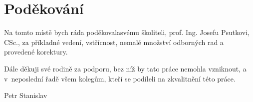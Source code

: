 \chapter*{Poděkování}

\noindent Na tomto místě bych ráda poděkovalasvému školiteli, prof. Ing. Josefu Psutkovi, CSc., za příkladné vedení, vstřícnost, nemalé množství odborných rad a provedené korektury.

\vspace*{1cm}

\noindent Dále děkuji své rodině za podporu, bez níž by tato práce nemohla vzniknout, a v~neposlední řadě všem kolegům, kteří se podíleli na zkvalitnění této práce.

\vspace*{1cm}
\noindent \hspace*{12cm} {Petr Stanislav}


